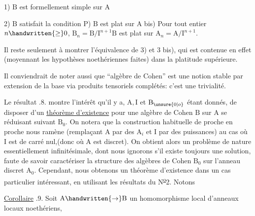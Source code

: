 
1) $\mathrm B$ est formellement simple sur $\mathrm A$

2) $\mathrm B$ satisfait la condition $\mathrm P$) $\mathrm B$ est plat sur $\mathrm A$ bis) Pour tout entier $n\handwritten{\geq}0$, $\mathrm B_n=\mathrm B/\mathrm I^{n+1}\mathrm B$ est plat sur $\mathrm A_n=\mathrm A/\mathrm I^{n+1}$. 

Il reste seulement à montrer l'équivalence de 3) et 3 bis), qui est contenue en effet (moyennant les hypothèses noethériennes faites) dans la platitude supérieure.

 Il conviendrait de noter aussi que ``algèbre de Cohen'' est une notion stable par extension de la base via produits tensoriels complétés: c'est une trivialité.

Le résultat .8. montre l'intérêt qu'il y a, $\mathrm A,\mathrm I$ et $\mathrm B_{\unsure{0|o}}$ étant donnés, de disposer d'un \uline{théorème d'existence} pour une algèbre de Cohen $\mathrm B$ sur $\mathrm A$ se réduisant suivant $\mathrm B_0$. On notera que la construction habituelle de proche en proche nous ramène (remplaçant $\mathrm A$ par des $\mathrm A_i$ et $\mathrm I$ par des puissances) au cas où $\mathrm I$ est de carré nul,(donc où $\mathrm A$ est discret). On obtient alors un problème de nature essentiellement infinitésimale, dont nous ignorons s'il existe toujours une solution, faute de savoir caractériser la structure des algèbres de Cohen $\mathrm B_0$ sur l'anneau discret $\mathrm A_0$. Cependant, nous obtenons  un théorème d'existence dans un cas particulier intéressant, en utilisant les résultats du N\textsuperscript{\uline{o}}2\deleted{\unsure{,}}. Notons 


\uline{Corollaire} .9. Soit $\mathrm A\handwritten{\to}\mathrm B$ un homomorphisme local d'anneaux locaux noethériens, 
